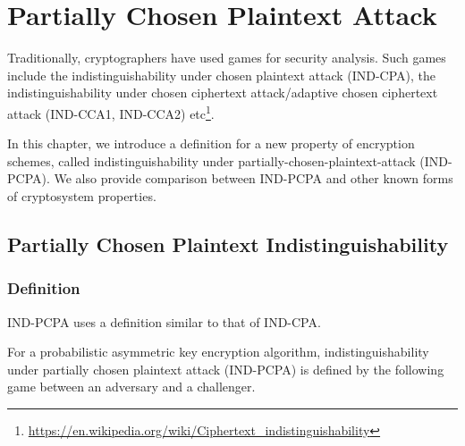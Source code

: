 \chapter{Partially Chosen Plaintext Attack}\label{ch:pcpa}

Traditionally, cryptographers have used games for security analysis. Such games
include the indistinguishability under chosen plaintext attack (IND-CPA), the
indistinguishability under chosen ciphertext attack/adaptive chosen ciphertext
attack (IND-CCA1, IND-CCA2)
etc\footnote{\url{https://en.wikipedia.org/wiki/Ciphertext_indistinguishability}}.

In this chapter, we introduce a definition for a new property of encryption
schemes, called indistinguishability under partially-chosen-plaintext-attack
(IND-PCPA). We also provide comparison between IND-PCPA and other known forms of
cryptosystem properties.

\section{Partially Chosen Plaintext Indistinguishability}\label{sec:indpcpa}

\subsection{Definition}

IND-PCPA uses a definition similar to that of IND-CPA.

For a probabilistic asymmetric key encryption algorithm, indistinguishability
under partially chosen plaintext attack (IND-PCPA) is defined by the following
game between an adversary and a challenger.

